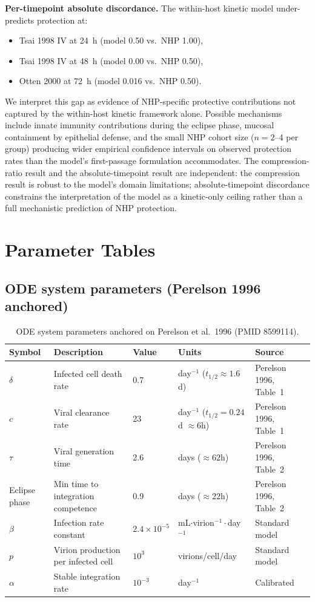 \documentclass[11pt]{article}
\theoremstyle{definition}
\theoremstyle{remark}
\begin{document}
\textbf{Per-timepoint absolute discordance.} The within-host kinetic model under-predicts protection at:
\begin{itemize}[nosep,leftmargin=2em]
    \item Tsai 1998 IV at 24~h (model 0.50 vs.\ NHP 1.00),
    \item Tsai 1998 IV at 48~h (model 0.00 vs.\ NHP 0.50),
    \item Otten 2000 at 72~h (model 0.016 vs.\ NHP 0.50).
\end{itemize}
We interpret this gap as evidence of NHP-specific protective contributions not captured by the within-host kinetic framework alone. Possible mechanisms include innate immunity contributions during the eclipse phase, mucosal containment by epithelial defense, and the small NHP cohort size ($n = 2$--4 per group) producing wider empirical confidence intervals on observed protection rates than the model's first-passage formulation accommodates. The compression-ratio result and the absolute-timepoint result are independent: the compression result is robust to the model's domain limitations; absolute-timepoint discordance constrains the interpretation of the model as a kinetic-only ceiling rather than a full mechanistic prediction of NHP protection.


\section{Parameter Tables}

\subsection{ODE system parameters (Perelson 1996 anchored)}

\begin{table}[H]
\centering
\small
\caption{ODE system parameters anchored on Perelson et al.\ 1996 (PMID 8599114).}
\begin{tabular}{@{}llllp{4.5cm}@{}}
\toprule
\textbf{Symbol} & \textbf{Description} & \textbf{Value} & \textbf{Units} & \textbf{Source} \\
\midrule
$\delta$ & Infected cell death rate & 0.7 & day$^{-1}$ ($t_{1/2} \approx 1.6$d) & Perelson 1996, Table~1 \\
$c$ & Viral clearance rate & 23 & day$^{-1}$ ($t_{1/2} = 0.24$d $\approx 6$h) & Perelson 1996, Table~1 \\
$\tau$ & Viral generation time & 2.6 & days ($\approx 62$h) & Perelson 1996, Table~2 \\
Eclipse phase & Min time to integration competence & 0.9 & days ($\approx 22$h) & Perelson 1996, Table~2 \\
$\beta$ & Infection rate constant & $2.4 \times 10^{-5}$ & mL$\cdot$virion$^{-1}\cdot$day$^{-1}$ & Standard model \\
$p$ & Virion production per infected cell & $10^{3}$ & virions/cell/day & Standard model \\
$\alpha$ & Stable integration rate & $10^{-3}$ & day$^{-1}$ & Calibrated \\
\bottomrule
\end{tabular}
\end{table}
\end{document}
